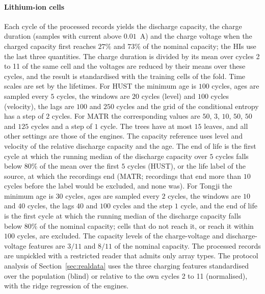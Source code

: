 \documentclass[preprint,12pt]{elsarticle}
\theoremstyle{definition}
\begin{document}
\paragraph{Lithium-ion cells} Each cycle of the processed records yields the discharge capacity, the charge duration (samples with current above $0.01$~A) and the charge voltage when the charged capacity first reaches $27\%$ and $73\%$ of the nominal capacity; the HIs use the last three quantities. The charge duration is divided by its mean over cycles 2 to 11 of the same cell and the voltages are reduced by their means over these cycles, and the result is standardised with the training cells of the fold. Time scales are set by the lifetimes. For HUST the minimum age is $100$ cycles, ages are sampled every $5$ cycles, the windows are $20$ cycles (level) and $100$ cycles (velocity), the lags are $100$ and $250$ cycles and the grid of the conditional entropy has a step of $2$ cycles. For MATR the corresponding values are $50$, $3$, $10$, $50$, $50$ and $125$ cycles and a step of $1$ cycle. The trees have at most $15$ leaves, and all other settings are those of the engines. The capacity reference uses level and velocity of the relative discharge capacity and the age. The end of life is the first cycle at which the running median of the discharge capacity over $5$ cycles falls below $80\%$ of the mean over the first $5$ cycles (HUST), or the life label of the source, at which the recordings end (MATR; recordings that end more than $10$ cycles before the label would be excluded, and none was). For Tongji the minimum age is $30$ cycles, ages are sampled every $2$ cycles, the windows are $10$ and $40$ cycles, the lags $40$ and $100$ cycles and the step $1$ cycle, and the end of life is the first cycle at which the running median of the discharge capacity falls below $80\%$ of the nominal capacity; cells that do not reach it, or reach it within $100$ cycles, are excluded. The capacity levels of the charge-voltage and discharge-voltage features are $3/11$ and $8/11$ of the nominal capacity. The processed records are unpickled with a restricted reader that admits only array types. The protocol analysis of Section~\ref{sec:realdata} uses the three charging features standardised over the population (blind) or relative to the own cycles 2 to 11 (normalised), with the ridge regression of the engines.
\end{document}
